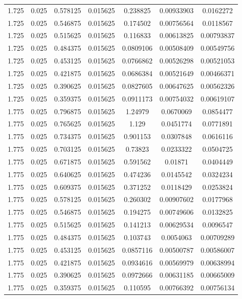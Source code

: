 \begin{flushleft}
\begin{longtable}{ccccccc}
1.725 & 0.025 & 0.578125 & 0.015625 & 0.238825 & 0.00933903 & 0.0162272  \\ 
1.725 & 0.025 & 0.546875 & 0.015625 & 0.174502 & 0.00756564 & 0.0118567  \\ 
1.725 & 0.025 & 0.515625 & 0.015625 & 0.116833 & 0.00613825 & 0.00793837  \\ 
1.725 & 0.025 & 0.484375 & 0.015625 & 0.0809106 & 0.00508409 & 0.00549756  \\ 
1.725 & 0.025 & 0.453125 & 0.015625 & 0.0766862 & 0.00526298 & 0.00521053  \\ 
1.725 & 0.025 & 0.421875 & 0.015625 & 0.0686384 & 0.00521649 & 0.00466371  \\ 
1.725 & 0.025 & 0.390625 & 0.015625 & 0.0827605 & 0.00647625 & 0.00562326  \\ 
1.725 & 0.025 & 0.359375 & 0.015625 & 0.0911173 & 0.00754032 & 0.00619107  \\ 
1.775 & 0.025 & 0.796875 & 0.015625 & 1.24979 & 0.0670069 & 0.0854477  \\ 
1.775 & 0.025 & 0.765625 & 0.015625 & 1.129 & 0.0451774 & 0.0771891  \\ 
1.775 & 0.025 & 0.734375 & 0.015625 & 0.901153 & 0.0307848 & 0.0616116  \\ 
1.775 & 0.025 & 0.703125 & 0.015625 & 0.73823 & 0.0233322 & 0.0504725  \\ 
1.775 & 0.025 & 0.671875 & 0.015625 & 0.591562 & 0.01871 & 0.0404449  \\ 
1.775 & 0.025 & 0.640625 & 0.015625 & 0.474236 & 0.0145542 & 0.0324234  \\ 
1.775 & 0.025 & 0.609375 & 0.015625 & 0.371252 & 0.0118429 & 0.0253824  \\ 
1.775 & 0.025 & 0.578125 & 0.015625 & 0.260302 & 0.00907602 & 0.0177968  \\ 
1.775 & 0.025 & 0.546875 & 0.015625 & 0.194275 & 0.00749606 & 0.0132825  \\ 
1.775 & 0.025 & 0.515625 & 0.015625 & 0.141213 & 0.00629534 & 0.0096547  \\ 
1.775 & 0.025 & 0.484375 & 0.015625 & 0.103743 & 0.0054063 & 0.00709289  \\ 
1.775 & 0.025 & 0.453125 & 0.015625 & 0.0857116 & 0.00500787 & 0.00586007  \\ 
1.775 & 0.025 & 0.421875 & 0.015625 & 0.0934616 & 0.00569979 & 0.00638994  \\ 
1.775 & 0.025 & 0.390625 & 0.015625 & 0.0972666 & 0.00631185 & 0.00665009  \\ 
1.775 & 0.025 & 0.359375 & 0.015625 & 0.110595 & 0.00766392 & 0.00756134  \\ 

\end{longtable}
\end{flushleft}
